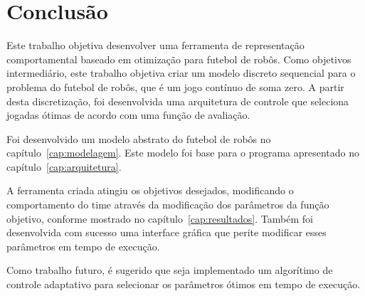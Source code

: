 \chapter*{Conclusão}\label{cap:conclusao}

Este trabalho objetiva desenvolver uma ferramenta de representação
comportamental baseado em otimização para futebol de robôs.
Como objetivos intermediário, este trabalho objetiva criar um modelo discreto
sequencial para o problema do futebol de robôs, que é um jogo contínuo de soma
zero. A partir desta discretização, foi desenvolvida uma arquitetura de
controle que seleciona jogadas ótimas de acordo com uma função de avaliação.

Foi desenvolvido um modelo abstrato do futebol de robôs no
capítulo~\ref{cap:modelagem}. Este modelo foi base para o
programa apresentado no capítulo~\ref{cap:arquitetura}.

A ferramenta criada atingiu os objetivos desejados, modificando o
comportamento do time através da modificação dos parâmetros da função
objetivo, conforme mostrado no capítulo~\ref{cap:resultados}. Também foi
desenvolvida com sucesso uma interface gráfica que perite modificar
esses parâmetros em tempo de execução.

Como trabalho futuro, é sugerido que seja implementado 
um algorítimo de controle adaptativo para selecionar os
parâmetros ótimos em tempo de execução.

